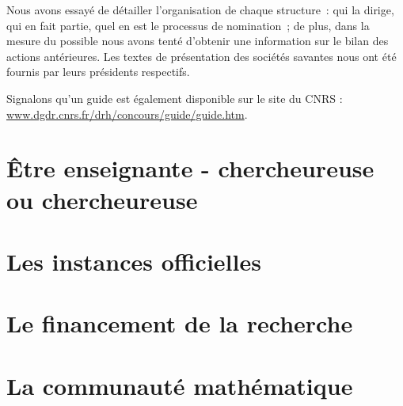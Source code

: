 \documentclass[11pt]{book}
\renewcommand*{\mp}{\textperiodcentered}
\begin{document}
Nous avons essay\'e de d\'etailler l'organisation de chaque structure~:
qui la dirige, qui en fait partie, quel en est le processus de
nomination~; de plus, dans la mesure du possible nous avons tent\'e
d'obtenir une information sur le bilan des actions ant\'erieures.
Les textes de pr\'e\-sen\-ta\-tion des
soci\'et\'es savantes nous ont \'et\'e
fournis par leurs pr\'esidents respectifs.

Signalons qu'un guide est \'egalement disponible sur le site du CNRS :
\url{www.dgdr.cnrs.fr/drh/concours/guide/guide.htm}.



\part{\^Etre enseignant\mp e - chercheur\mp euse ou chercheur\mp euse}








\part{Les instances officielles}


 







\part{Le financement de la recherche}





\part{La communaut\'e math\'ematique}








\printindex
\end{document}
